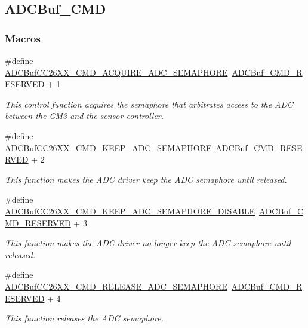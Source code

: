 \subsection{A\+D\+C\+Buf\+\_\+\+C\+M\+D}
\label{group___a_d_c_buf___c_m_d}
\subsubsection*{Macros}
\begin{DoxyCompactItemize}
\item 
\#define \hyperlink{group___a_d_c_buf___c_m_d_ga0a536e47b039d0f506a4245079af247e}{A\+D\+C\+Buf\+C\+C26\+X\+X\+\_\+\+C\+M\+D\+\_\+\+A\+C\+Q\+U\+I\+R\+E\+\_\+\+A\+D\+C\+\_\+\+S\+E\+M\+A\+P\+H\+O\+R\+E}~\hyperlink{_a_d_c_buf_8h_a6d889e191027535ad318be0b9c3765d1}{A\+D\+C\+Buf\+\_\+\+C\+M\+D\+\_\+\+R\+E\+S\+E\+R\+V\+E\+D} + 1
\begin{DoxyCompactList}\small\item\em This control function acquires the semaphore that arbitrates access to the A\+D\+C between the C\+M3 and the sensor controller. \end{DoxyCompactList}\item 
\#define \hyperlink{group___a_d_c_buf___c_m_d_ga830dac4199ded43c278e48bb1fe9725e}{A\+D\+C\+Buf\+C\+C26\+X\+X\+\_\+\+C\+M\+D\+\_\+\+K\+E\+E\+P\+\_\+\+A\+D\+C\+\_\+\+S\+E\+M\+A\+P\+H\+O\+R\+E}~\hyperlink{_a_d_c_buf_8h_a6d889e191027535ad318be0b9c3765d1}{A\+D\+C\+Buf\+\_\+\+C\+M\+D\+\_\+\+R\+E\+S\+E\+R\+V\+E\+D} + 2
\begin{DoxyCompactList}\small\item\em This function makes the A\+D\+C driver keep the A\+D\+C semaphore until released. \end{DoxyCompactList}\item 
\#define \hyperlink{group___a_d_c_buf___c_m_d_ga23015764922f21c49518aa1050d70c0e}{A\+D\+C\+Buf\+C\+C26\+X\+X\+\_\+\+C\+M\+D\+\_\+\+K\+E\+E\+P\+\_\+\+A\+D\+C\+\_\+\+S\+E\+M\+A\+P\+H\+O\+R\+E\+\_\+\+D\+I\+S\+A\+B\+L\+E}~\hyperlink{_a_d_c_buf_8h_a6d889e191027535ad318be0b9c3765d1}{A\+D\+C\+Buf\+\_\+\+C\+M\+D\+\_\+\+R\+E\+S\+E\+R\+V\+E\+D} + 3
\begin{DoxyCompactList}\small\item\em This function makes the A\+D\+C driver no longer keep the A\+D\+C semaphore until released. \end{DoxyCompactList}\item 
\#define \hyperlink{group___a_d_c_buf___c_m_d_gaaacc1d31de8c38e71c351bc1fcd54340}{A\+D\+C\+Buf\+C\+C26\+X\+X\+\_\+\+C\+M\+D\+\_\+\+R\+E\+L\+E\+A\+S\+E\+\_\+\+A\+D\+C\+\_\+\+S\+E\+M\+A\+P\+H\+O\+R\+E}~\hyperlink{_a_d_c_buf_8h_a6d889e191027535ad318be0b9c3765d1}{A\+D\+C\+Buf\+\_\+\+C\+M\+D\+\_\+\+R\+E\+S\+E\+R\+V\+E\+D} + 4
\begin{DoxyCompactList}\small\item\em This function releases the A\+D\+C semaphore. \end{DoxyCompactList}\end{DoxyCompactItemize}


